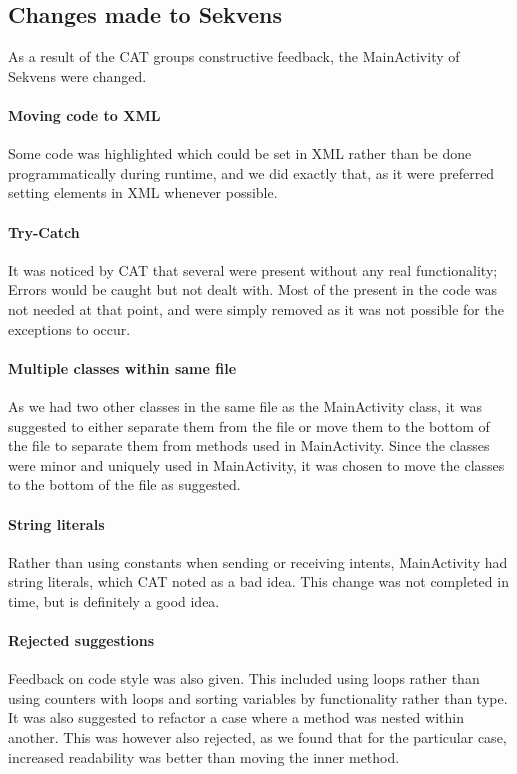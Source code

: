 \subsection{Changes made to Sekvens}\label{subsec:collab_sekvensresult}
As a result of the CAT groups constructive feedback, the MainActivity of Sekvens were changed.

\paragraph{Moving code to XML}
Some code was highlighted which could be set in XML rather than be done programmatically during runtime, and we did exactly that, as it were preferred setting elements in XML whenever possible.

\paragraph{Try-Catch}
It was noticed by CAT that several  were present without any real functionality; Errors would be caught but not dealt with. Most of the  present in the code was not needed at that point, and were simply removed as it was not possible for the exceptions to occur.

\paragraph{Multiple classes within same file}
As we had two other classes in the same file as the MainActivity class, it was suggested to either separate them from the file or move them to the bottom of the file to separate them from methods used in MainActivity. Since the classes were minor and uniquely used in MainActivity, it was chosen to move the classes to the bottom of the file as suggested.

\paragraph{String literals}
Rather than using constants when sending or receiving intents, MainActivity had string literals, which CAT noted as a bad idea. This change was not completed in time, but is definitely a good idea.

\paragraph{Rejected suggestions}
Feedback on code style was also given. This included using  loops rather than using counters with  loops and sorting variables by functionality rather than type. It was also suggested to refactor a case where a method was nested within another. This was however also rejected, as we found that for the particular case, increased readability was better than moving the inner method.